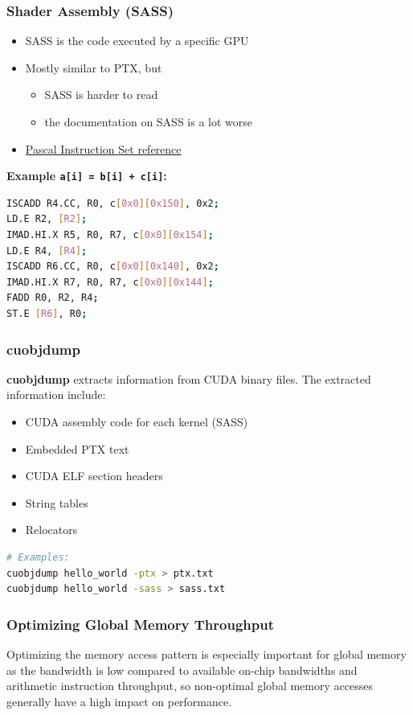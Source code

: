 \documentclass[aspectratio=169,handout]{beamer}
\begin{document}
\begin{frame}[fragile]
\frametitle{Shader Assembly (SASS)}
\begin{itemize}
\item SASS is the code executed by a specific GPU
\item Mostly similar to PTX, but
\begin{itemize}
	\item SASS is harder to read
	\item the documentation on SASS is a lot worse
\end{itemize}
\item \href{https://docs.nvidia.com/cuda/cuda-binary-utilities/index.html#maxwell-pascal}{Pascal Instruction Set reference}
\end{itemize}
\textbf{Example \texttt{a[i] = b[i] + c[i]}:}
\begin{lstlisting}[language=bash]
ISCADD R4.CC, R0, c[0x0][0x150], 0x2;
LD.E R2, [R2];              
IMAD.HI.X R5, R0, R7, c[0x0][0x154]; 
LD.E R4, [R4];            
ISCADD R6.CC, R0, c[0x0][0x140], 0x2; 
IMAD.HI.X R7, R0, R7, c[0x0][0x144];  
FADD R0, R2, R4; 
ST.E [R6], R0;    
\end{lstlisting}
\end{frame}


\begin{frame}[fragile]
	\frametitle{cuobjdump}
	\textbf{cuobjdump} extracts information from CUDA binary files. The extracted information include:
	\begin{itemize}
		\item CUDA assembly code for each kernel (SASS)
		\item Embedded PTX text
		\item CUDA ELF section headers
		\item String tables
		\item Relocators
	\end{itemize}	

\begin{lstlisting}[language=bash]
# Examples:
cuobjdump hello_world -ptx > ptx.txt
cuobjdump hello_world -sass > sass.txt
\end{lstlisting}
\end{frame}


\begin{frame}[fragile]
\frametitle{Optimizing Global Memory Throughput}

\begin{mdframed}[frametitle={Cuda Programming Guide:}]
Optimizing the memory access pattern is especially important for global memory as the bandwidth is low compared to available on-chip bandwidths and arithmetic instruction throughput, so non-optimal global memory accesses generally have a high impact on performance. 
\end{mdframed}

\end{frame}
\end{document}
